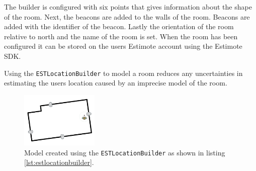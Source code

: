 The builder is configured with six points that gives information about the shape of the room. Next, the beacons are added to the walls of the room. Beacons are added with the identifier of the beacon. Lastly the orientation of the room relative to north and the name of the room is set. When the room has been configured it can be stored on the users Estimote account using the Estimote SDK.

Using the \texttt{ESTLocationBuilder} to model a room reduces any uncertainties in estimating the users location caused by an imprecise model of the room.

\begin{figure}
\centering
\includegraphics[width=0.33\textwidth]{images/living-room}
\caption{Model created using the \texttt{ESTLocationBuilder} as shown in listing \ref{lst:estlocationbuilder}.}
\label{fig:estlocationbuilder-livingroom}
\end{figure}


